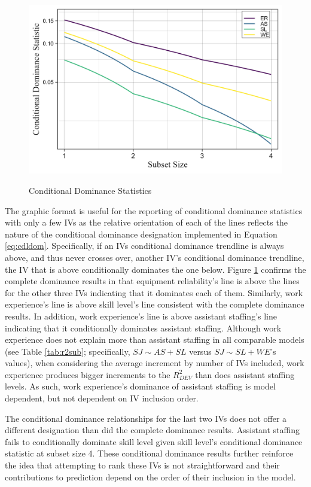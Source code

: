 \documentclass[ShortAfour,times,sageapa]{sagej}
\begin{document}
	\begin{figure}[h!]
		\centering
		\caption{\centering Conditional Dominance Statistics}
		\includegraphics{includes/condit_gph}
		\label{fg:cdl}
	\end{figure}

	The graphic format is useful for the reporting of conditional dominance statistics with only a few IVs as the relative orientation of each of the lines reflects the nature of the conditional dominance designation implemented in Equation \ref{eq:cdldom}.
	Specifically, if an IVs conditional dominance trendline is always above, and thus never crosses over, another IV's conditional dominance trendline, the IV that is above conditionally dominates the one below.
	Figure \ref{fg:cdl} confirms the complete dominance results in that equipment reliability's line is above the lines for the other three IVs indicating that it dominates each of them.
	Similarly, work experience's line is above skill level's line consistent with the complete dominance results.
	In addition, work experience's line is above assistant staffing's line indicating that it conditionally dominates assistant staffing.
	Although work experience does not explain more than assistant staffing in all comparable models (see Table \ref{tab:r2sub}; specifically, $SJ \sim AS + SL$ versus $SJ \sim SL + WE$'s values), when considering the average increment by number of IVs included, work experience produces bigger increments to the $R^2_{DEV}$ than does assistant staffing levels. 
	As such, work experience's dominance of assistant staffing is model dependent, but not dependent on IV inclusion order.
	
	The conditional dominance relationships for the last two IVs does not offer a different designation than did the complete dominance results.
	Assistant staffing fails to conditionally dominate skill level given skill level's conditional dominance statistic at subset size 4.
	These conditional dominance results further reinforce the idea that attempting to rank these IVs is not straightforward and their contributions to prediction depend on the order of their inclusion in the model. 
	
\end{document}
